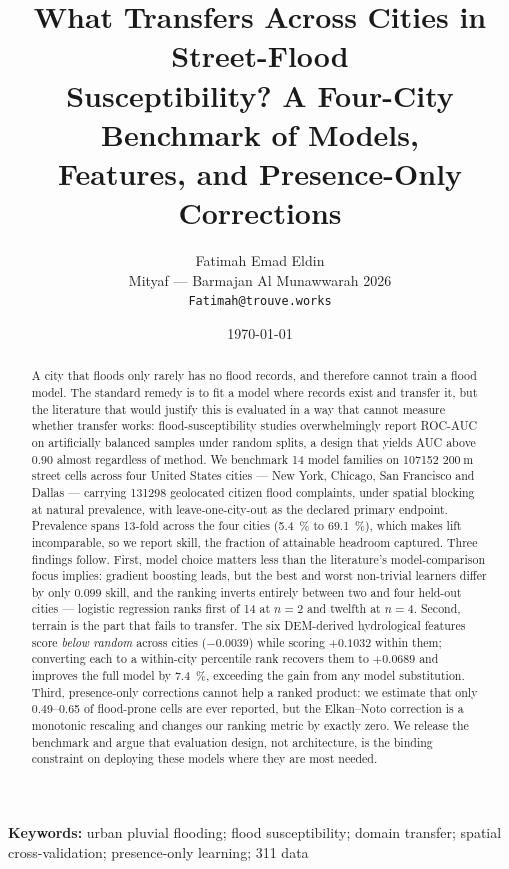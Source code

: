 \documentclass[11pt]{article}
\title{\bfseries What Transfers Across Cities in Street-Flood\\
Susceptibility? A Four-City Benchmark of Models,\\
Features, and Presence-Only Corrections}
\author{%
  Fatimah Emad Eldin\\
  \small Mityaf --- Barmajan Al Munawwarah 2026\\
  \small \texttt{Fatimah@trouve.works}
}
\date{\today}
\begin{document}
\maketitle

\begin{abstract}
\noindent
A city that floods only rarely has no flood records, and therefore cannot train
a flood model. The standard remedy is to fit a model where records exist and transfer
it, but the literature that would justify this is evaluated in a way that cannot
measure whether transfer works: flood-susceptibility studies overwhelmingly
report ROC-AUC on artificially balanced samples under random splits, a design
that yields AUC above $0.90$ almost regardless of method. We benchmark
\num{14} model families on \num{107152} $\SI{200}{\metre}$ street cells across
four United States cities --- New York, Chicago, San Francisco and Dallas ---
carrying \num{131298} geolocated citizen flood complaints, under spatial
blocking at natural prevalence, with leave-one-city-out as the declared primary
endpoint. Prevalence spans \num{13}-fold across the four cities
(\SI{5.4}{\percent} to \SI{69.1}{\percent}), which makes lift incomparable, so we
report skill, the fraction of attainable headroom captured. Three findings
follow. First, model choice matters less than the literature's model-comparison
focus implies: gradient boosting leads, but the best and worst non-trivial
learners differ by only $0.099$ skill, and the ranking inverts entirely between
two and four held-out cities --- logistic regression ranks first of \num{14} at
$n{=}2$ and twelfth at $n{=}4$. Second, terrain is the part that fails to
transfer. The six DEM-derived hydrological features score \emph{below random}
across cities ($-0.0039$) while scoring $+0.1032$ within them; converting each to
a within-city percentile rank recovers them to $+0.0689$ and improves the full
model by \SI{7.4}{\percent}, exceeding the gain from any model substitution.
Third, presence-only corrections cannot help a ranked product: we estimate that
only \numrange{0.49}{0.65} of flood-prone cells are ever reported, but the
Elkan--Noto correction is a monotonic rescaling and changes our ranking metric by
exactly zero. We release the benchmark and argue that evaluation design, not
architecture, is the binding constraint on deploying these models where they are
most needed.
\end{abstract}

\noindent\textbf{Keywords:} urban pluvial flooding; flood susceptibility;
domain transfer; spatial cross-validation; presence-only learning; 311 data
\end{document}
